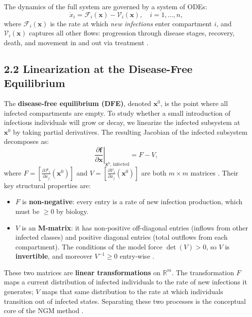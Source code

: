 \documentclass[12pt]{article}
\theoremstyle{plain}
\theoremstyle{definition}
\begin{document}
The dynamics of the full system are governed by a system of ODEs:
\[
  \dot{x}_i = \mathcal{F}_i(\mathbf{x}) - \mathcal{V}_i(\mathbf{x}), \quad i = 1, \ldots, n,
\]
where $\mathcal{F}_i(\mathbf{x})$ is the rate at which \emph{new infections} enter
compartment $i$, and $\mathcal{V}_i(\mathbf{x})$ captures all other flows: progression
through disease stages, recovery, death, and movement in and out via treatment
\cite{vddriessche2002}.

\subsection*{2.2 \quad Linearization at the Disease-Free Equilibrium}

The \textbf{disease-free equilibrium (DFE)}, denoted $\mathbf{x}^0$, is the point where
all infected compartments are empty. To study whether a small introduction of infectious
individuals will grow or decay, we linearize the infected subsystem at $\mathbf{x}^0$ by
taking partial derivatives. The resulting Jacobian of the infected subsystem decomposes as:
\[
  \left.\frac{\partial \mathbf{f}}{\partial \mathbf{x}}\right|_{\mathbf{x}^0,\,\text{infected}} = F - V,
\]
where $F = \left[\frac{\partial \mathcal{F}_i}{\partial x_j}(\mathbf{x}^0)\right]$ and
$V = \left[\frac{\partial \mathcal{V}_i}{\partial x_j}(\mathbf{x}^0)\right]$ are both
$m \times m$ matrices \cite{vddriessche2002}. Their key structural properties are:

\begin{itemize}
  \item $F$ is \textbf{non-negative}: every entry is a rate of new infection production,
  which must be $\geq 0$ by biology.
  \item $V$ is an \textbf{M-matrix}: it has non-positive off-diagonal entries (inflows from
  other infected classes) and positive diagonal entries (total outflows from each
  compartment). The conditions of the model force $\det(V) > 0$, so $V$ is
  \textbf{invertible}, and moreover $V^{-1} \geq 0$ entry-wise \cite{vddriessche2002}.
\end{itemize}

These two matrices are \textbf{linear transformations} on $\mathbb{R}^m$. The
transformation $F$ maps a current distribution of infected individuals to the rate of new
infections it generates; $V$ maps that same distribution to the rate at which individuals
transition out of infected states. Separating these two processes is the conceptual core of
the NGM method \cite{diekmann2010}.
\end{document}
